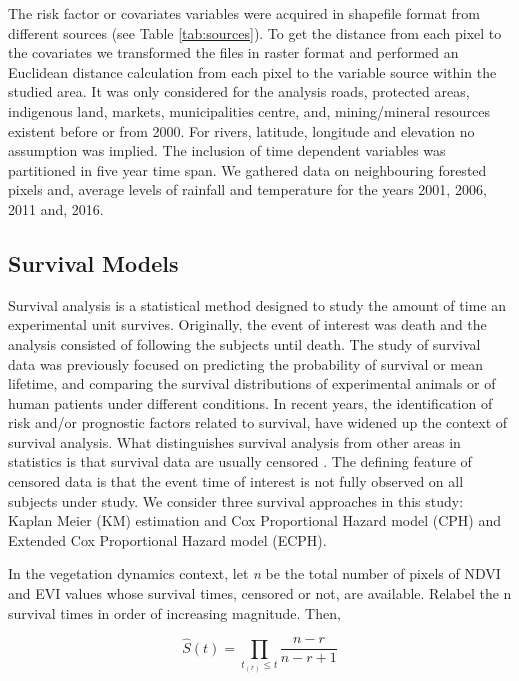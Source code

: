 
The risk factor or covariates variables were acquired in shapefile format from different sources (see Table \ref{tab:sources}). To get the distance from each pixel to the covariates we transformed the files in raster format and performed an Euclidean distance calculation from each pixel to the variable source within the studied area. It was only considered for the analysis roads, protected areas, indigenous land, markets, municipalities centre, and, mining/mineral resources existent before or from 2000. For rivers, latitude, longitude and elevation no assumption was implied. The inclusion of time dependent variables was partitioned in five year time span. We gathered data on neighbouring forested pixels and, average levels of rainfall and temperature for the years 2001, 2006, 2011 and, 2016. 

\subsection{Survival Models}  %

Survival analysis is a statistical method designed to study the amount of time an experimental unit survives. Originally, the event of interest was death and the analysis consisted of following the subjects until death. The study of survival data was previously focused on predicting the probability of survival or mean lifetime, and comparing the survival distributions of experimental animals or of human patients under different conditions. In recent years, the identification of risk and/or prognostic factors related to survival, have widened up the context of survival analysis. What distinguishes survival analysis from other areas in statistics is that survival data are usually censored \citep{lee_wang_2003,cao_2005}. The defining feature of censored data is that the event time of interest is not fully observed on all subjects under study. We consider three survival approaches in this study: Kaplan Meier (KM) estimation and Cox Proportional Hazard model (CPH) and Extended Cox Proportional Hazard model (ECPH).


In the vegetation dynamics context, let \textit{n} be the total number of pixels of NDVI and EVI values whose survival times, censored or not, are available. Relabel the n survival times in order of increasing magnitude. Then,

\begin{center}
\begin{equation}
\hat{S}(t) = \prod_{t_{(r)} \leq t} \frac{n-r}{n-r + 1}\label{eq:3} 
\end{equation}
\end{center}

